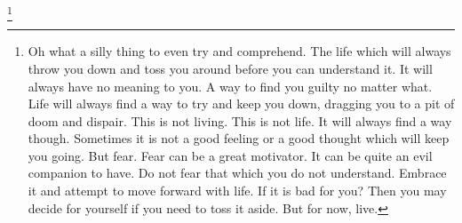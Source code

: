 \footnote{
Oh what a silly thing to even try and comprehend. The life which will always
throw you down and toss you around before you can understand it. It will always
have no meaning to you. A way to find you guilty no matter what. Life will
always find a way to try and keep you down, dragging you to a pit of doom and
dispair. This is not living. This is not life. It will always find a way though.
Sometimes it is not a good feeling or a good thought which will keep you going.
But fear. Fear can be a great motivator. It can be quite an evil companion to
have. Do not fear that which you do not understand. Embrace it and attempt to
move forward with life. If it is bad for you? Then you may decide for yourself
if you need to toss it aside. But for now, live.
}
